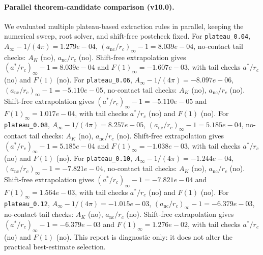 \paragraph{Parallel theorem-candidate comparison (v10.0).}
We evaluated multiple plateau-based extraction rules in parallel, keeping the numerical sweep, root solver, and shift-free postcheck fixed. For \texttt{plateau_0.04}, $A_\infty-1/(4\pi)=1.279e-04$, $(a_{\mathrm{nc}}/r_c)_\infty-1=8.039e-04$, no-contact tail checks: $A_K$ (no), $a_{\mathrm{nc}}/r_c$ (no). Shift-free extrapolation gives $(a^*/r_c)_\infty-1=8.039e-04$ and $F(1)_\infty=-1.607e-03$, with tail checks $a^*/r_c$ (no) and $F(1)$ (no). For \texttt{plateau_0.06}, $A_\infty-1/(4\pi)=-8.097e-06$, $(a_{\mathrm{nc}}/r_c)_\infty-1=-5.110e-05$, no-contact tail checks: $A_K$ (no), $a_{\mathrm{nc}}/r_c$ (no). Shift-free extrapolation gives $(a^*/r_c)_\infty-1=-5.110e-05$ and $F(1)_\infty=1.017e-04$, with tail checks $a^*/r_c$ (no) and $F(1)$ (no). For \texttt{plateau_0.08}, $A_\infty-1/(4\pi)=8.257e-05$, $(a_{\mathrm{nc}}/r_c)_\infty-1=5.185e-04$, no-contact tail checks: $A_K$ (no), $a_{\mathrm{nc}}/r_c$ (no). Shift-free extrapolation gives $(a^*/r_c)_\infty-1=5.185e-04$ and $F(1)_\infty=-1.038e-03$, with tail checks $a^*/r_c$ (no) and $F(1)$ (no). For \texttt{plateau_0.10}, $A_\infty-1/(4\pi)=-1.244e-04$, $(a_{\mathrm{nc}}/r_c)_\infty-1=-7.821e-04$, no-contact tail checks: $A_K$ (no), $a_{\mathrm{nc}}/r_c$ (no). Shift-free extrapolation gives $(a^*/r_c)_\infty-1=-7.821e-04$ and $F(1)_\infty=1.564e-03$, with tail checks $a^*/r_c$ (no) and $F(1)$ (no). For \texttt{plateau_0.12}, $A_\infty-1/(4\pi)=-1.015e-03$, $(a_{\mathrm{nc}}/r_c)_\infty-1=-6.379e-03$, no-contact tail checks: $A_K$ (no), $a_{\mathrm{nc}}/r_c$ (no). Shift-free extrapolation gives $(a^*/r_c)_\infty-1=-6.379e-03$ and $F(1)_\infty=1.276e-02$, with tail checks $a^*/r_c$ (no) and $F(1)$ (no). This report is diagnostic only: it does not alter the practical best-estimate selection.
